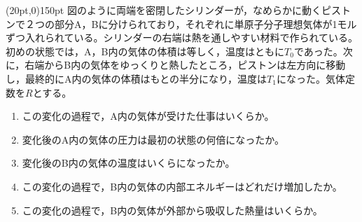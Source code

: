 \hakosyokika
\item
    \begin{mawarikomi}(20pt,0){150pt}{}
        図のように両端を密閉したシリンダーが，なめらかに動くピストンで２つの部分A，Bに分けられており，それぞれに単原子分子理想気体が1モルずつ入れられている。シリンダーの右端は熱を通しやすい材料で作られている。
        初めの状態では，A，B内の気体の体積は等しく，温度はともに$T_0$であった。次に，右端からB内の気体をゆっくりと熱したところ，ピストンは左方向に移動し，最終的にA内の気体の体積はもとの半分になり，温度は$T_1$になった。気体定数を$R$とする。
        \begin{enumerate}
            \item この変化の過程で，A内の気体が受けた仕事はいくらか。
            \item 変化後のA内の気体の圧力は最初の状態の何倍になったか。
            \item 変化後のB内の気体の温度はいくらになったか。
            \item この変化の過程で，B内の気体の内部エネルギーはどれだけ増加したか。
            \item この変化の過程で，B内の気体が外部から吸収した熱量はいくらか。
        \end{enumerate}
    \end{mawarikomi}